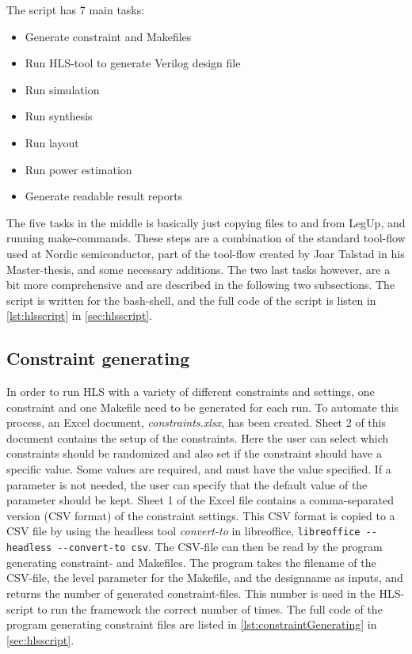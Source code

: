 The script has 7 main tasks:
\begin{itemize}
    \item Generate constraint and Makefiles
    \item Run HLS-tool to generate Verilog design file
    \item Run simulation
    \item Run synthesis
    \item Run layout
    \item Run power estimation
    \item Generate readable result reports
\end{itemize}
The five tasks in the middle is basically just copying files to and from LegUp, and running make-commands. These steps are a combination of the standard tool-flow used at Nordic semiconductor, part of the tool-flow created by Joar Talstad in his Master-thesis, and some necessary additions. The two last tasks however, are a bit more comprehensive and are described in the following two subsections. The script is written for the bash-shell, and the full code of the script is listen in \cref{lst:hlsscript} in \cref{sec:hlsscript}.

\subsection{Constraint generating}
In order to run HLS with a variety of different constraints and settings, one constraint and one Makefile need to be generated for each run. To automate this process, an Excel document, \textit{constraints.xlsx}, has been created. Sheet 2 of this document contains the setup of the constraints. Here the user can select which constraints should be randomized and also set if the constraint should have a specific value. Some values are required, and must have the value specified. If a parameter is not needed, the user can specify that the default value of the parameter should be kept. 
Sheet 1 of the Excel file contains a comma-separated version (CSV format) of the constraint settings. This CSV format is copied to a CSV file by using the headless tool \textit{convert-to} in libreoffice, \verb!libreoffice --headless --convert-to csv!. The CSV-file can then be read by the program generating constraint- and Makefiles. The program takes the filename of the CSV-file, the level parameter for the Makefile, and the designname as inputs, and returns the number of generated constraint-files. This number is used in the HLS-script to run the framework the correct number of times. The full code of the program generating constraint files are listed in \cref{lst:constraintGenerating} in \cref{sec:hlsscript}.

